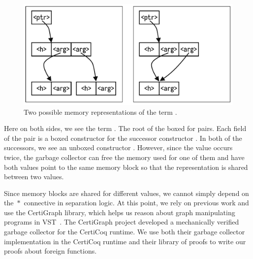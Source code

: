 \begin{figure}[H]
\includegraphics[scale=.49]{figures/gcdual.pdf}
\centering
\caption{Two possible memory representations of the term .}
\end{figure}


Here on both sides, we see the term . The root of the \gls{boxed} \constructor{} for pairs. Each field of the pair is a boxed constructor for the successor constructor . In both of the successors, we see an \gls{unboxed} constructor . However, since the  value occurs twice, the garbage collector can free the memory used for one of them and have both values point to the same memory block so that the representation is shared between two values.

Since memory blocks are shared for different values, we cannot simply depend on the $\mathrel{*}$ connective in separation logic. At this point, we rely on previous work and use the CertiGraph library, which helps us reason about graph manipulating programs in VST~\cite{wang2019graph, shengyi2020mechanized}. The CertiGraph project developed a mechanically verified garbage collector for the CertiCoq runtime. We use both their garbage collector implementation in the CertiCoq runtime and their library of proofs to write our proofs about foreign functions.

